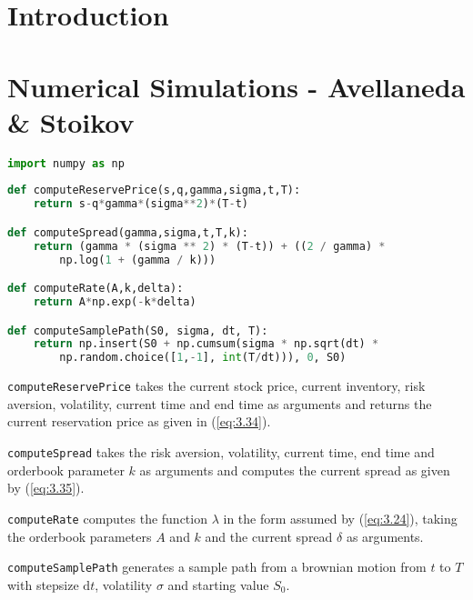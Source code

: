 \section{Introduction}

\section{Numerical Simulations - Avellaneda \& Stoikov}

\begin{lstlisting}[language=Python, caption=Auxiliary Functions]
import numpy as np
        
def computeReservePrice(s,q,gamma,sigma,t,T):
    return s-q*gamma*(sigma**2)*(T-t)

def computeSpread(gamma,sigma,t,T,k):
    return (gamma * (sigma ** 2) * (T-t)) + ((2 / gamma) * 
        np.log(1 + (gamma / k)))

def computeRate(A,k,delta):
    return A*np.exp(-k*delta)

def computeSamplePath(S0, sigma, dt, T):
    return np.insert(S0 + np.cumsum(sigma * np.sqrt(dt) * 
        np.random.choice([1,-1], int(T/dt))), 0, S0)
\end{lstlisting}

\texttt{computeReservePrice} takes the current stock price, current
inventory, risk aversion, volatility, current time and end time as
arguments and returns the current reservation price as given in 
(\ref{eq:3.34}).

\texttt{computeSpread} takes the risk aversion, volatility, current
time, end time and orderbook parameter $k$ as arguments and computes
the current spread as given by (\ref{eq:3.35}).

\texttt{computeRate} computes the function $\lambda$ in the form assumed
by (\ref{eq:3.24}), taking the orderbook parameters $A$ and $k$ and the 
current spread $\delta$ as arguments.

\texttt{computeSamplePath} generates a sample path from a brownian motion
from $t$ to $T$ with stepsize $\mathrm dt$, volatility $\sigma$ and starting
value $S_0$.

